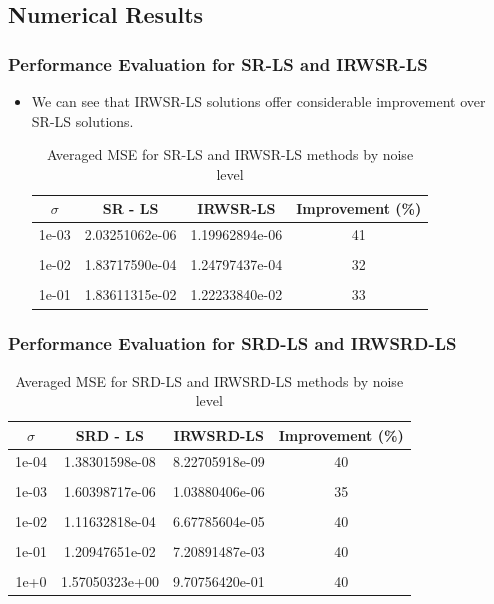 \documentclass [t] {beamer} %
\begin{document}
\subsection{Numerical Results}
\begin{frame} %

\frametitle{Performance Evaluation for SR-LS and IRWSR-LS} 
\normalsize
\begin{itemize}
\item 
We can see that IRWSR-LS solutions offer considerable improvement over SR-LS solutions.
\begin{table}
\caption[c]{Averaged MSE for SR-LS and IRWSR-LS methods by noise level}
\begin{tabular}{|c|c|c|c|}
\toprule
\textbf{$\sigma$ } & \textbf{SR - LS} & \textbf{IRWSR-LS } & \textbf{Improvement (\%)}\\
\midrule 
1e-03&	2.03251062e-06&	1.19962894e-06& 41	\\ &&&\\
1e-02&	1.83717590e-04&	1.24797437e-04& 32	\\ &&&\\
1e-01&	1.83611315e-02&	1.22233840e-02& 33	\\ 
\bottomrule
\end{tabular}
\end{table}

\end{itemize}
\end{frame}


\begin{frame} %
\frametitle{Performance Evaluation for SRD-LS and IRWSRD-LS} 
\normalsize

\begin{table}
\caption{Averaged MSE for SRD-LS and IRWSRD-LS methods by noise level}
\begin{tabular}{|c|c|c|c|}
\toprule
\textbf{$\sigma$ } & \textbf{SRD - LS} & \textbf{IRWSRD-LS } & \textbf{Improvement (\%)}\\
\midrule
1e-04&	1.38301598e-08&	8.22705918e-09& 40\\ &&&\\
1e-03&	1.60398717e-06&	1.03880406e-06& 35\\ &&&\\
1e-02&	1.11632818e-04&	6.67785604e-05& 40\\ &&&\\
1e-01&	1.20947651e-02&	7.20891487e-03& 40\\ &&&\\
1e+0&	1.57050323e+00&	9.70756420e-01& 40\\ %
\bottomrule
\end{tabular}
\end{table}
\end{frame}
\end{document}
